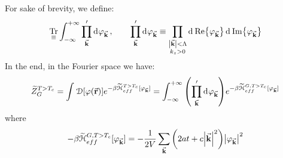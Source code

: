 \documentclass[../../Main/Main.tex]{subfiles}
\begin{document}
For sake of brevity, we define:
\begin{equation}
  \underset{\equiv}{\text{Tr}} \int_{-\infty }^{+\infty } \prod_{\va{k}}'  \dd[]{\varphi _{\va{k}}}, \qquad
   \prod_{\va{k}}' \dd[]{\varphi _{\va{k}}} \equiv \prod_{\substack{ \abs{\va{k}} < \Lambda   \\ k_z >0 } }^{}   \dd[]{\Re {\varphi _{\va{k}}}}  \dd[]{\Im {\varphi _{\va{k}}}}
\end{equation}
In the end,  in the Fourier space we have:
\begin{equation}
  \widetilde{Z} _{G}^{T>T_c} =   \int_{}^{} \mathcal{D} \qty[\varphi (\va{r})]
  e^{- \beta \widetilde{\mathcal{H}}_{eff}^{T>T_c} [\varphi _{\va{k}}] } =
   \int_{- \infty }^{+ \infty }  \qty( \prod_{\va{k}}'  \dd[]{\varphi _{\va{k}}})
  e^{- \beta \widetilde{\mathcal{H}}_{eff}^{G,T>T_c} [\varphi _{\va{k}}] }
  \label{eq:18_9}
\end{equation}
where
\begin{equation}
  - \beta \widetilde{\mathcal{H}}_{eff}^{G,T>T_c} [\varphi _{\va{k}}] = - \frac{1}{2V} \sum_{\va{k}}^{} \qty(2at+c \abs{\va{k}}^2 ) \abs{\varphi _{\va{k}}}^2
\end{equation}
\end{document}
